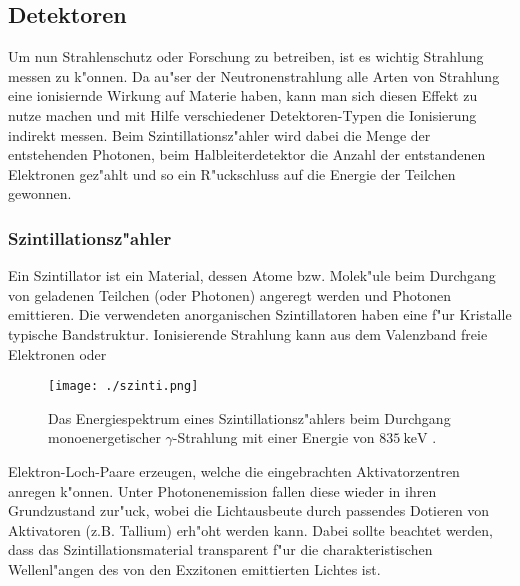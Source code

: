 \documentclass[12pt]{article}
\begin{document}
\subsection{Detektoren}

Um nun Strahlenschutz oder Forschung zu betreiben, ist es wichtig Strahlung messen zu k"onnen. Da au"ser der Neutronenstrahlung alle Arten von Strahlung eine ionisiernde Wirkung auf Materie haben, kann man sich diesen Effekt zu nutze machen und mit Hilfe verschiedener Detektoren-Typen die Ionisierung indirekt messen. Beim Szintillationsz"ahler wird dabei die Menge der entstehenden Photonen, beim Halbleiterdetektor die Anzahl der entstandenen Elektronen gez"ahlt und so ein R"uckschluss auf die Energie der Teilchen gewonnen. 

\subsubsection{Szintillationsz"ahler}
Ein Szintillator ist ein Material, dessen Atome bzw. Molek"ule beim Durchgang von geladenen Teilchen (oder Photonen) angeregt werden und Photonen emittieren. Die verwendeten anorganischen Szintillatoren haben eine f"ur Kristalle typische Bandstruktur. Ionisierende Strahlung kann aus dem Valenzband freie Elektronen oder  
\begin{wrapfigure}{r}[2cm]{0.4\textwidth}
 	\texttt{[image: ./szinti.png]}
 	\caption[Energiespektrum Szintillator]{Das Energiespektrum eines Szintillationsz"ahlers beim Durchgang monoenergetischer $\gamma$-Strahlung mit einer Energie von $\SI{835}{\kilo\electronvolt}$ \cite{demtroeder}.}    
 	\label{fig:spektrum_szinti}
\end{wrapfigure}
\noindent
Elektron-Loch-Paare erzeugen, welche die eingebrachten Aktivatorzentren anregen k"onnen. Unter Photonenemission fallen diese wieder in ihren Grundzustand zur"uck, wobei die Lichtausbeute durch passendes Dotieren von Aktivatoren (z.B. Tallium) erh"oht werden kann. Dabei sollte beachtet werden, dass das Szintillationsmaterial transparent f"ur die charakteristischen Wellenl"angen des von den Exzitonen emittierten Lichtes ist.
\par 
\end{document}
